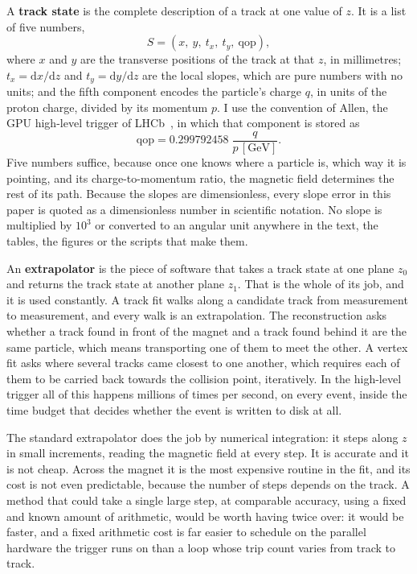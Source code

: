 \documentclass[11pt,a4paper]{article}
\newcommand{\qop}{\ensuremath{\mathrm{qop}}}
\begin{document}
A \textbf{track state} is the complete description of a track at one value of
$z$. It is a list of five numbers,
%
\begin{equation}
  S = (x,\ y,\ t_x,\ t_y,\ \qop),
  \label{eq:state}
\end{equation}
%
where $x$ and $y$ are the transverse positions of the track at that $z$, in
millimetres; $t_x = \mathrm{d}x/\mathrm{d}z$ and $t_y = \mathrm{d}y/\mathrm{d}z$
are the local slopes, which are pure numbers with no units; and the fifth
component encodes the particle's charge $q$, in units of the proton charge,
divided by its momentum $p$. I use the convention of Allen, the GPU high-level
trigger of LHCb~\citep{aaij2020}, in which that component is stored as
%
\begin{equation}
  \qop = 0.299792458\;\frac{q}{p\,[\mathrm{GeV}]}.
  \label{eq:qop}
\end{equation}
%
Five numbers suffice, because once one knows where a particle is, which way it
is pointing, and its charge-to-momentum ratio, the magnetic field determines
the rest of its path. Because the slopes are dimensionless, every slope error
in this paper is quoted as a dimensionless number in scientific notation. No
slope is multiplied by $10^{3}$ or converted to an angular unit anywhere in the
text, the tables, the figures or the scripts that make them.

An \textbf{extrapolator} is the piece of software that takes a track state at
one plane $z_0$ and returns the track state at another plane $z_1$. That is the
whole of its job, and it is used constantly. A track fit walks along a
candidate track from measurement to measurement, and every walk is an
extrapolation. The reconstruction asks whether a track found in front of the
magnet and a track found behind it are the same particle, which means
transporting one of them to meet the other. A vertex fit asks where several
tracks came closest to one another, which requires each of them to be carried
back towards the collision point, iteratively. In the high-level trigger all of
this happens millions of times per second, on every event, inside the time
budget that decides whether the event is written to disk at all.

The standard extrapolator does the job by numerical integration: it steps along
$z$ in small increments, reading the magnetic field at every step. It is
accurate and it is not cheap. Across the magnet it is the most expensive
routine in the fit, and its cost is not even predictable, because the number of
steps depends on the track. A method that could take a single large step, at
comparable accuracy, using a fixed and known amount of arithmetic, would be
worth having twice over: it would be faster, and a fixed arithmetic cost is far
easier to schedule on the parallel hardware the trigger runs on than a loop
whose trip count varies from track to track.
\end{document}
